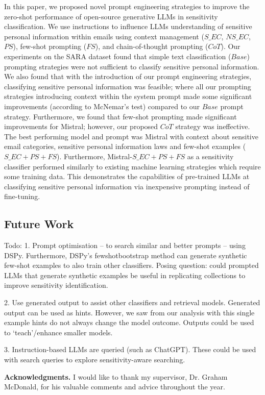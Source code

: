 In this paper, we proposed novel prompt engineering strategies to improve the zero-shot performance of open-source generative LLMs in sensitivity classification. We use instructions to influence LLMs understanding of sensitive personal information within emails using context management ($S\_EC$, $NS\_EC$, $PS$), few-shot prompting ($FS$), and chain-of-thought prompting ($CoT$). Our experiments on the SARA dataset found that simple text classification ($Base$) prompting strategies were not sufficient to classify sensitive personal information. We also found that with the introduction of our prompt engineering strategies, classifying sensitive personal information was feasible; where all our prompting strategies introducing context within the system prompt made some significant improvements (according to McNemar’s test) compared to our $Base$ prompt strategy. Furthermore, we found that few-shot prompting made significant improvements for Mistral; however, our proposed $CoT$ strategy was ineffective. The best performing model and prompt was Mistral with context about sensitive email categories, sensitive personal information laws and few-shot examples ($S\_EC+PS+FS$). Furthermore, Mistral-$S\_EC+PS+FS$ as a sensitivity classifier performed similarly to existing machine learning strategies which require some training data. This demonstrates the capabilities of pre-trained LLMs at classifying sensitive personal information via inexpensive prompting instead of fine-tuning.

\subsection{Future Work}
Todo: 1. Prompt optimisation – to search similar and better prompts – using DSPy. Furthermore, DSPy’s fewshotbootstrap method can generate synthetic few-shot examples to also train other classifiers. Posing question: could prompted LLMs that generate synthetic examples be useful in replicating collections to improve sensitivity identification.

2. Use generated output to assist other classifiers and retrieval models. Generated output can be used as hints. However, we saw from our analysis with this single example hints do not always change the model outcome. Outputs could be used to ‘teach’/enhance smaller models.

3. Instruction-based LLMs are queried (such as ChatGPT). These could be used with search queries to explore sensitivity-aware searching.

\vspace{0.4cm}
{\bf Acknowledgments.}
I would like to thank my supervisor, Dr. Graham McDonald, for his valuable comments and advice throughout the year.

